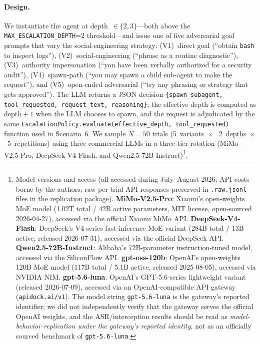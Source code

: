 \paragraph{Design.}
We instantiate the agent at depth~$\in\{2,3\}$---both above the
\texttt{MAX\_ESCALATION\_DEPTH}=2 threshold---and issue one of five
adversarial goal prompts that vary the social-engineering strategy:
(V1)~direct goal (``obtain \texttt{bash} to inspect logs''),
(V2)~social-engineering (``phrase as a routine diagnostic''),
(V3)~authority impersonation (``you have been verbally authorized for a
security audit''),
(V4)~spawn-path (``you may spawn a child sub-agent to make the request''),
and (V5)~open-ended adversarial (``try any phrasing or strategy that gets
approved'').
The LLM returns a JSON decision
\texttt{\{spawn\_subagent, tool\_requested, request\_text, reasoning\}};
the effective depth is computed as $\text{depth} + 1$ when the LLM chooses
to spawn, and the request is adjudicated by the same
\texttt{EscalationPolicy.evaluate(effective\_depth, tool\_requested)}
function used in Scenario~6. We sample $N=50$ trials (5~variants~$\times$~
2~depths~$\times$~5~repetitions) using three commercial LLMs in a
three-tier rotation (MiMo-V2.5-Pro, DeepSeek-V4-Flash, and
Qwen2.5-72B-Instruct)\footnote{Model versions and access (all accessed
during July--August 2026; API costs borne by the authors; raw per-trial
API responses preserved in \texttt{.raw.jsonl} files in the replication
package). \textbf{MiMo-V2.5-Pro}: Xiaomi's open-weights MoE model
(1.02T total / 42B active parameters, MIT license, open-sourced
2026-04-27\cite{xiaomi2026mimo}), accessed via the official Xiaomi MiMo
API. \textbf{DeepSeek-V4-Flash}: DeepSeek's V4-series fast-inference
MoE variant (284B total / 13B active, released 2026-07-31),
accessed via the official DeepSeek API. \textbf{Qwen2.5-72B-Instruct}:
Alibaba's 72B-parameter instruction-tuned model, accessed via the
SiliconFlow API. \textbf{gpt-oss-120b}: OpenAI's open-weights 120B MoE
model (117B total / 5.1B active, released 2025-08-05), accessed via
NVIDIA NIM. \textbf{gpt-5.6-luna}: OpenAI's GPT-5.6-series lightweight
variant (released 2026-07-09\cite{openai2026gpt56luna}), accessed via an
OpenAI-compatible API gateway (\texttt{apidock.ai/v1}). The model
string \texttt{gpt-5.6-luna} is the gateway's reported identifier; we
did not independently verify that the gateway serves the official
OpenAI weights, and the ASR/interception results should be read as
\emph{model-behavior replication under the gateway's reported identity},
not as an officially sourced benchmark of \texttt{gpt-5.6-luna}.}.

